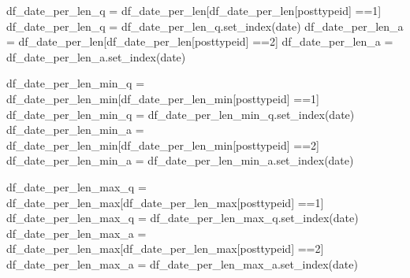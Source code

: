 \documentclass[
  letterpaper,
  DIV=11,
  numbers=noendperiod]{scrartcl}
\newenvironment{Shaded}{\begin{snugshade}}{\end{snugshade}}
\newcommand{\NormalTok}[1]{\textcolor[rgb]{0.00,0.23,0.31}{#1}}
\newcommand{\OperatorTok}[1]{\textcolor[rgb]{0.37,0.37,0.37}{#1}}
\newcommand{\StringTok}[1]{\textcolor[rgb]{0.13,0.47,0.30}{#1}}
\begin{document}
\begin{Shaded}
\begin{Highlighting}[]
\NormalTok{df\_date\_per\_len\_q }\OperatorTok{=}\NormalTok{ df\_date\_per\_len[df\_date\_per\_len[}\StringTok{\textquotesingle{}posttypeid\textquotesingle{}}\NormalTok{] }\OperatorTok{==}\StringTok{\textquotesingle{}1\textquotesingle{}}\NormalTok{]}
\NormalTok{df\_date\_per\_len\_q }\OperatorTok{=}\NormalTok{ df\_date\_per\_len\_q.set\_index(}\StringTok{\textquotesingle{}date\textquotesingle{}}\NormalTok{)}
\NormalTok{df\_date\_per\_len\_a }\OperatorTok{=}\NormalTok{ df\_date\_per\_len[df\_date\_per\_len[}\StringTok{\textquotesingle{}posttypeid\textquotesingle{}}\NormalTok{] }\OperatorTok{==}\StringTok{\textquotesingle{}2\textquotesingle{}}\NormalTok{]}
\NormalTok{df\_date\_per\_len\_a }\OperatorTok{=}\NormalTok{ df\_date\_per\_len\_a.set\_index(}\StringTok{\textquotesingle{}date\textquotesingle{}}\NormalTok{)}
\end{Highlighting}
\end{Shaded}

\begin{Shaded}
\begin{Highlighting}[]
\NormalTok{df\_date\_per\_len\_min\_q }\OperatorTok{=}\NormalTok{ df\_date\_per\_len\_min[df\_date\_per\_len\_min[}\StringTok{\textquotesingle{}posttypeid\textquotesingle{}}\NormalTok{] }\OperatorTok{==}\StringTok{\textquotesingle{}1\textquotesingle{}}\NormalTok{]}
\NormalTok{df\_date\_per\_len\_min\_q }\OperatorTok{=}\NormalTok{ df\_date\_per\_len\_min\_q.set\_index(}\StringTok{\textquotesingle{}date\textquotesingle{}}\NormalTok{)}
\NormalTok{df\_date\_per\_len\_min\_a }\OperatorTok{=}\NormalTok{ df\_date\_per\_len\_min[df\_date\_per\_len\_min[}\StringTok{\textquotesingle{}posttypeid\textquotesingle{}}\NormalTok{] }\OperatorTok{==}\StringTok{\textquotesingle{}2\textquotesingle{}}\NormalTok{]}
\NormalTok{df\_date\_per\_len\_min\_a }\OperatorTok{=}\NormalTok{ df\_date\_per\_len\_min\_a.set\_index(}\StringTok{\textquotesingle{}date\textquotesingle{}}\NormalTok{)}
\end{Highlighting}
\end{Shaded}

\begin{Shaded}
\begin{Highlighting}[]
\NormalTok{df\_date\_per\_len\_max\_q }\OperatorTok{=}\NormalTok{ df\_date\_per\_len\_max[df\_date\_per\_len\_max[}\StringTok{\textquotesingle{}posttypeid\textquotesingle{}}\NormalTok{] }\OperatorTok{==}\StringTok{\textquotesingle{}1\textquotesingle{}}\NormalTok{]}
\NormalTok{df\_date\_per\_len\_max\_q }\OperatorTok{=}\NormalTok{ df\_date\_per\_len\_max\_q.set\_index(}\StringTok{\textquotesingle{}date\textquotesingle{}}\NormalTok{)}
\NormalTok{df\_date\_per\_len\_max\_a }\OperatorTok{=}\NormalTok{ df\_date\_per\_len\_max[df\_date\_per\_len\_max[}\StringTok{\textquotesingle{}posttypeid\textquotesingle{}}\NormalTok{] }\OperatorTok{==}\StringTok{\textquotesingle{}2\textquotesingle{}}\NormalTok{]}
\NormalTok{df\_date\_per\_len\_max\_a }\OperatorTok{=}\NormalTok{ df\_date\_per\_len\_max\_a.set\_index(}\StringTok{\textquotesingle{}date\textquotesingle{}}\NormalTok{)}
\end{Highlighting}
\end{Shaded}
\end{document}

